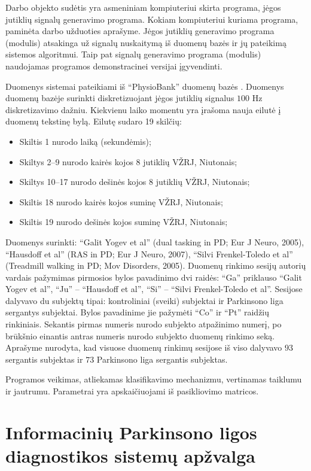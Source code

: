 \documentclass[]{vgtuef}
\begin{document}
Darbo objekto sudėtis yra asmeniniam kompiuteriui skirta programa, jėgos jutiklių signalų generavimo programa. Kokiam kompiuteriui kuriama programa, paminėta darbo užduoties aprašyme. Jėgos jutiklių generavimo programa (modulis) atsakinga už signalų nuskaitymą iš duomenų bazės ir jų pateikimą sistemos algoritmui. Taip pat signalų generavimo programa (modulis) naudojamas programos demonstracinei versijai įgyvendinti.

Duomenys sistemai pateikiami iš ``PhysioBank'' duomenų bazės \cite{932728}. Duomenys duomenų bazėje surinkti diskretizuojant jėgos jutiklių signalus $100$ Hz diskretizavimo dažniu. Kiekvienu laiko momentu yra įrašoma nauja eilutė į duomenų tekstinę bylą. Eilutę sudaro 19 skilčių:

\begin{itemize}
\item Skiltis 1 nurodo laiką (sekundėmis);
\item Skiltys 2--9 nurodo kairės kojos 8 jutiklių VŽRJ, Niutonais;
\item Skiltys 10--17 nurodo dešinės kojos 8 jutiklių VŽRJ, Niutonais;
\item Skiltis 18 nurodo kairės kojos suminę VŽRJ, Niutonais;
\item Skiltis 19 nurodo dešinės kojos suminę VŽRJ, Niutonais;
\end{itemize}


Duomenys surinkti: ``Galit Yogev et al'' (dual tasking in PD; Eur J Neuro, 2005), ``Hausdoff et al'' (RAS in PD; Eur J Neuro, 2007), ``Silvi Frenkel-Toledo et al'' (Treadmill walking in PD; Mov Disorders, 2005). Duomenų rinkimo sesijų autorių vardais pažymimas pirmosios bylos pavadinimo dvi raidės: ``Ga'' priklauso ``Galit Yogev et al'', ``Ju'' -- ``Hausdoff et al'', ``Si'' -- ``Silvi Frenkel-Toledo et al''. Sesijose dalyvavo du subjektų tipai: kontroliniai (sveiki) subjektai ir Parkinsono liga sergantys subjektai. Bylos pavadinime jie pažymėti ``Co'' ir ``Pt'' raidžių rinkiniais. Sekantis pirmas numeris nurodo subjekto atpažinimo numerį, po brūkšnio einantis antras numeris nurodo subjekto duomenų rinkimo seką. Aprašyme nurodyta, kad visuose duomenų rinkimų sesijose iš viso dalyvavo $93$ sergantis subjektas ir $73$ Parkinsono liga sergantis subjektas.

Programos veikimas, atliekamas klasifikavimo mechanizmu, vertinamas taiklumu ir jautrumu. Parametrai yra apskaičiuojami iš pasikliovimo matricos.

\section{Informacinių Parkinsono ligos diagnostikos sistemų apžvalga}
\end{document}
